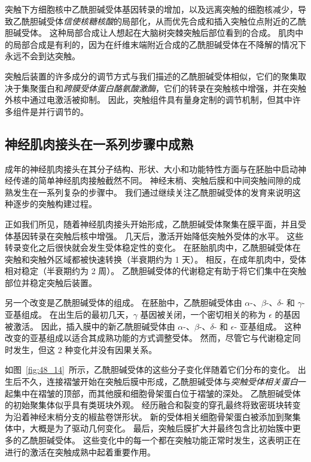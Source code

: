 突触下方细胞核中乙酰胆碱受体基因转录的增加，以及远离突触的细胞核减少，导致乙酰胆碱受体\textit{信使核糖核酸}的局部化，从而优先合成和插入突触位点附近的乙酰胆碱受体。
这种局部合成让人想起在大脑树突棘突触后部位看到的合成。
肌肉中的局部合成是有利的，因为在纤维末端附近合成的乙酰胆碱受体在不降解的情况下永远不会到达突触。


突触后装置的许多成分的调节方式与我们描述的乙酰胆碱受体相似，它们的聚集取决于集聚蛋白和\textit{跨膜受体蛋白酪氨酸激酶}，它们的转录在突触核中增强，并在突触外核中通过电激活被抑制。
因此，突触组件具有量身定制的调节机制，但其中许多组件是并行调节的。



\subsection{神经肌肉接头在一系列步骤中成熟}

成年的神经肌肉接头在其分子结构、形状、大小和功能特性方面与在胚胎中启动神经传递的简单神经肌肉接触截然不同。
神经末梢、突触后膜和中间突触间隙的成熟发生在一系列复杂的步骤中。
我们通过继续关注乙酰胆碱受体的发育来说明这种逐步的突触构建过程。


正如我们所见，随着神经肌肉接头开始形成，乙酰胆碱受体聚集在膜平面，并且受体基因转录在突触后核中增强。
几天后，激活开始降低突触外受体的水平。
这些转录变化之后很快就会发生受体稳定性的变化。
在胚胎肌肉中，乙酰胆碱受体在突触和突触外区域都被快速转换（半衰期约为 1 天）。
相反，在成年肌肉中，受体相对稳定（半衰期约为 2 周）。
乙酰胆碱受体的代谢稳定有助于将它们集中在突触部位并稳定突触后装置。


另一个改变是乙酰胆碱受体的组成。
在胚胎中，乙酰胆碱受体由 $ \alpha $-、$ \beta $-、$ \delta $- 和 $ \gamma $- 亚基组成。
在出生后的最初几天，$ \gamma $ 基因被关闭，一个密切相关的称为 $ \epsilon $ 的基因被激活。
因此，插入膜中的新乙酰胆碱受体由 $ \alpha $-、$ \beta $-、$ \delta $- 和 $ \epsilon $- 亚基组成。
这种改变的亚基组成以适合其成熟功能的方式调整受体。
然而，尽管它与代谢稳定同时发生，但这 2 种变化并没有因果关系。


如图~\ref{fig:48_14}~所示，乙酰胆碱受体的这些分子变化伴随着它们分布的变化。
出生后不久，连接褶皱开始在突触后膜中形成，乙酰胆碱受体与\textit{突触受体相关蛋白}一起集中在褶皱的顶部，而其他膜和细胞骨架蛋白位于褶皱的深处。
乙酰胆碱受体的初始聚集体似乎具有类斑块外观。
经历融合和裂变的穿孔最终将致密斑块转变为沿着神经末梢分支的椒盐卷饼形状。
新的受体相关细胞骨架蛋白被添加到聚集体中，大概是为了驱动几何变化。
最后，突触后膜扩大并最终包含比初始簇中更多的乙酰胆碱受体。
这些变化中的每一个都在突触功能正常时发生，这表明正在进行的激活在突触成熟中起着重要作用。


